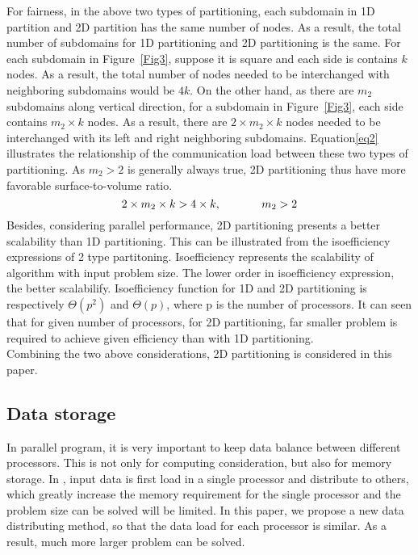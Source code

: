 \documentclass{sig-alternate}
\begin{document}
	For fairness, in the above two types of partitioning, each subdomain in 1D partition and 2D partition has the same number
	of nodes. As a result, the total number of subdomains for 1D partitioning and 2D partitioning is the same. For each subdomain 
	in Figure~\ref{Fig3}, suppose it is square and each side is contains $k$ nodes. As a result, the total 
	number of nodes needed to be interchanged with neighboring subdomains would be $4k$. On the other hand, as 
	there are $m_2$ subdomains along vertical direction, for a subdomain in Figure~\ref{Fig3}, each side contains
	$m_2\times k$ nodes. As a result, there are $2\times m_2\times k$ nodes needed to be interchanged with its left and right 
	neighboring subdomains. Equation\eqref{eq2} illustrates the relationship of the communication load between these two types of
	partitioning. As $m_2>2$ is generally always true, 2D partitioning thus have more favorable surface-to-volume ratio.    
	\begin{equation}
		2\times m_2\times k > 4\times k, \hspace{0.5 in} m_2 > 2 \label{eq2}
	\end{equation}
	Besides, considering parallel performance, 2D partitioning presents a better scalability than 1D partitioning. This can be
	illustrated from the isoefficiency expressions of 2 type partitoning. Isoefficiency represents the scalability of algorithm
	with input problem size. The lower order in isoefficiency expression, the better scalabilify. Isoefficiency function for 1D 
	and 2D partitioning is respectively $\Theta(p^2)$ and $\Theta(p)$\cite{Grama}\cite{Kumar}, where p is the number of processors. 
	It can seen that for given number of processors, for 2D partitioning, far smaller problem is required to achieve given 
	efficiency than with 1D partitioning.\\

	Combining the two above considerations, 2D partitioning is considered in this paper.\\	
	  
  \subsection{Data storage}
	In parallel program, it is very important to keep data balance between different processors. This is not only for computing
	consideration, but also for memory storage. In \cite{Quming}, input data is first load in a single processor and distribute
	to others, which greatly increase the memory requirement for the single processor and the problem size can be solved will be
	limited. In this paper, we propose a new data distributing method, so that the data load for each processor is similar. As a
	result, much more larger problem can be solved.\\
\end{document}
